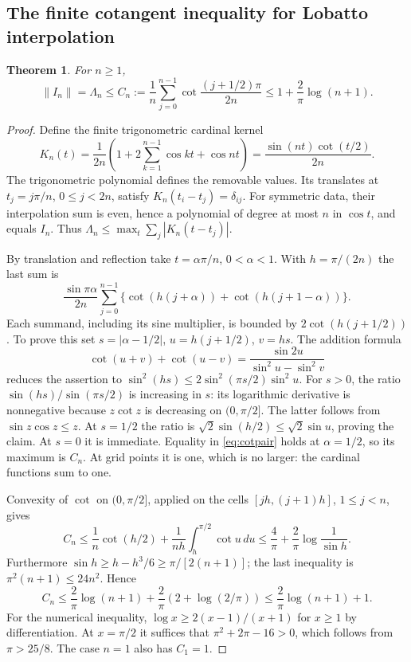 \documentclass[11pt]{article}
\newcommand{\norm}[1]{\left\lVert#1\right\rVert}
\newtheorem{theorem}{Theorem}[section]
\theoremstyle{remark}\newtheorem{remark}[theorem]{Remark}
\begin{document}
\subsection{The finite cotangent inequality for Lobatto interpolation}
\begin{theorem}\label{thm:lobatto}
For $n\ge1$,
\[
 \norm{I_n}=\Lambda_n\le
 C_n:=\frac1n\sum_{j=0}^{n-1}\cot\frac{(j+1/2)\pi}{2n}
 \le1+\frac2\pi\log(n+1).
\]
\end{theorem}
\begin{proof}
Define the finite trigonometric cardinal kernel
\[
 K_n(t)=\frac1{2n}\left(1+2\sum_{k=1}^{n-1}\cos kt+\cos nt\right)
       =\frac{\sin(nt)\cot(t/2)}{2n}.
\]
The trigonometric polynomial defines the removable values. Its translates
at $t_j=j\pi/n$, $0\le j<2n$, satisfy $K_n(t_i-t_j)=\delta_{ij}$.
For symmetric data, their interpolation sum is even, hence a polynomial
of degree at most $n$ in $\cos t$, and equals $I_n$. Thus
$\Lambda_n\le\max_t\sum_j|K_n(t-t_j)|$.

By translation and reflection take $t=\alpha\pi/n$, $0<\alpha<1$.
With $h=\pi/(2n)$ the last sum is
\begin{equation}\label{eq:cotpair}
 \frac{\sin\pi\alpha}{2n}\sum_{j=0}^{n-1}
 \{\cot(h(j+\alpha))+\cot(h(j+1-\alpha))\}.
\end{equation}
Each summand, including its sine multiplier, is bounded by
$2\cot(h(j+1/2))$. To prove this set $s=|\alpha-1/2|$,
$u=h(j+1/2)$, $v=hs$. The addition formula
\[
 \cot(u+v)+\cot(u-v)=\frac{\sin2u}{\sin^2u-\sin^2v}
\]
reduces the assertion to
$\sin^2(hs)\le2\sin^2(\pi s/2)\sin^2u$.
For $s>0$, the ratio $\sin(hs)/\sin(\pi s/2)$ is increasing in $s$:
its logarithmic derivative is nonnegative because $z\cot z$ is decreasing
on $(0,\pi/2]$. The latter follows from $\sin z\cos z\le z$.
At $s=1/2$ the ratio is $\sqrt2\sin(h/2)\le\sqrt2\sin u$, proving
the claim. At $s=0$ it is immediate. Equality in \eqref{eq:cotpair}
holds at $\alpha=1/2$, so its maximum is $C_n$. At grid points it is one,
which is no larger: the cardinal functions sum to one.

Convexity of $\cot$ on $(0,\pi/2]$, applied on the cells
$[jh,(j+1)h]$, $1\le j<n$, gives
\[
 C_n\le\frac1n\cot(h/2)+\frac1{nh}\int_h^{\pi/2}\cot u\,du
 \le\frac4\pi+\frac2\pi\log\frac1{\sin h}.
\]
Furthermore $\sin h\ge h-h^3/6\ge\pi/[2(n+1)]$; the last inequality
is $\pi^2(n+1)\le24n^2$. Hence
\[
 C_n\le\frac2\pi\log(n+1)+\frac2\pi(2+\log(2/\pi))
       \le\frac2\pi\log(n+1)+1.
\]
For the numerical inequality, $\log x\ge2(x-1)/(x+1)$ for $x\ge1$
by differentiation. At $x=\pi/2$ it suffices that
$\pi^2+2\pi-16>0$, which follows from $\pi>25/8$.
The case $n=1$ also has $C_1=1$.
\end{proof}
\end{document}
